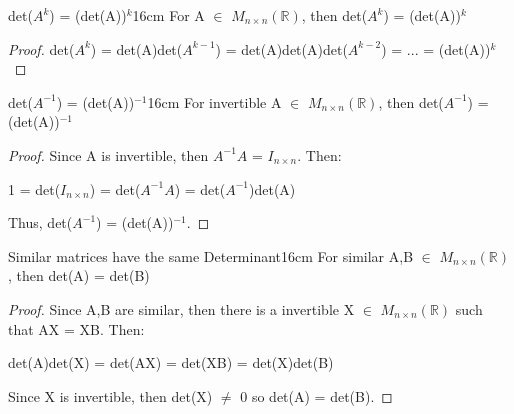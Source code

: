     \vspace{0.5cm}



    \begin{corollary}{det($A^k$) = (det(A))$^k$}{16cm}
        For A $\in$ $M_{n \times n}(\mathbb{R})$,
        then det($A^k$) = (det(A))$^k$
    \end{corollary}

    \begin{proof}
        det($A^k$)
        = det(A)det($A^{k-1}$)
        = det(A)det(A)det($A^{k-2}$)
        = ...
        = (det(A))$^k$
    \end{proof}

    \vspace{0.5cm}



    \begin{corollary}{det($A^{-1}$) = (det(A))$^{-1}$}{16cm}
        For invertible A $\in$ $M_{n \times n}(\mathbb{R})$,
        then det($A^{-1}$) = (det(A))$^{-1}$
    \end{corollary}

    \begin{proof}
        Since A is invertible, then $A^{-1}A$ = $I_{n \times n}$. Then:

        \hspace{0.5cm}
        1 = det($I_{n \times n}$)
        = det($A^{-1}A$)
        = det($A^{-1}$)det(A)

        Thus, det($A^{-1}$) = (det(A))$^{-1}$.
    \end{proof}

    \vspace{0.5cm}



    \begin{corollary}{Similar matrices have the same Determinant}{16cm}
        For similar A,B $\in$ $M_{n \times n}(\mathbb{R})$,
        then det(A) = det(B)
    \end{corollary}

    \begin{proof}
        Since A,B are similar, then there is a invertible
        X $\in$ $M_{n \times n}(\mathbb{R})$ such that AX = XB. Then:

        \hspace{0.5cm}
        det(A)det(X)
        = det(AX)
        = det(XB)
        = det(X)det(B)

        Since X is invertible, then det(X) $\not =$ 0 so det(A) = det(B).
    \end{proof}

